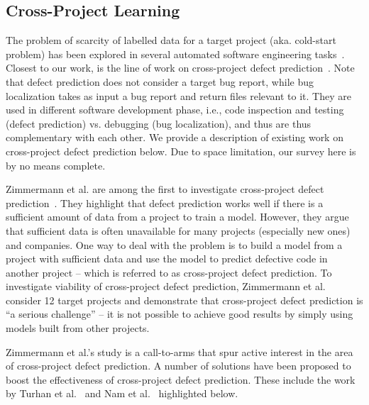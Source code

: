 \subsection{Cross-Project Learning}\label{sec.crossproj}

The problem of scarcity of labelled data for a target project (aka. cold-start problem) has been explored in several automated software engineering tasks~\cite{ZimmermannNGGM09,TurhanMBS09,NamPK13,KitchenhamMT07}. Closest to our work, is the line of work on cross-project defect prediction~\cite{ZimmermannNGGM09,TurhanMBS09,NamPK13}. Note that defect prediction does not consider a target bug report, while bug localization takes as input a bug report and return files relevant to it. They are used in different software development phase, i.e., code inspection and testing (defect prediction) vs. debugging (bug localization), and thus are thus complementary with each other. We provide a description of existing work on cross-project defect prediction below. Due to space limitation, our survey here is by no means complete.

Zimmermann et al. are among the first to investigate cross-project defect prediction~\cite{ZimmermannNGGM09}. They highlight that defect prediction works well if there is a sufficient amount of data from a project to train a model. However, they argue that sufficient data is often unavailable for many projects (especially new ones) and companies. One way to deal with the problem is to build a model from a project with sufficient data and use the model to predict defective code in another project -- which is referred to as cross-project defect prediction. To investigate viability of cross-project defect prediction, Zimmermann et al. consider 12 target projects and demonstrate that cross-project defect prediction is ``a serious challenge'' -- it is not possible to achieve good results by simply using models built from other projects.

Zimmermann et al.'s study is a call-to-arms that spur active interest in the area of cross-project defect prediction. A number of solutions have been proposed to boost the effectiveness of cross-project defect prediction. These include the work by Turhan et al.~\cite{TurhanMBS09} and Nam et al.~\cite{NamPK13} highlighted below.

